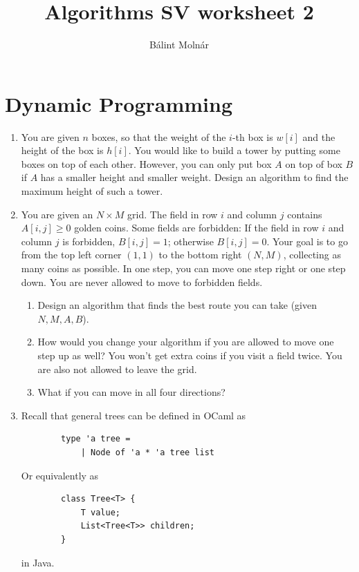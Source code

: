 \documentclass{article}
\title{{Algorithms SV worksheet 2}}
\author{Bálint Molnár}
\begin{document}
\maketitle


\section{Dynamic Programming}

\begin{enumerate}
    \item You are given $n$ boxes, so that the weight of the $i$-th box is $w[i]$ and the height of the box is $h[i]$. You would like to build a tower by putting some boxes on top of each other. However, you can only put box $A$ on top of box $B$ if $A$ has a smaller height and smaller weight. Design an algorithm to find the maximum height of such a tower.
    \item

    You are given an $N \times M$ grid. The field in row $i$ and column $j$ contains $A[i,j]\geq 0$ golden coins. Some fields are forbidden: If the field in row $i$ and column $j$ is forbidden, $B[i,j] = 1$; otherwise $B[i,j]=0$. Your goal is to go from the top left corner $(1,1)$ to the bottom right $(N, M)$, collecting as many coins as possible. In one step, you can move one step right or one step down. You are never allowed to move to forbidden fields.
    \begin{enumerate}
        \item Design an algorithm that finds the best route you can take (given $N, M, A, B$).
        \item How would you change your algorithm if you are allowed to move one step up as well? You won't get extra coins if you visit a field twice. You are also not allowed to leave the grid.
        \item What if you can move in all four directions?
    \end{enumerate}
    
    
    \item Recall that general trees can be defined in OCaml as
    \begin{verbatim}
        type 'a tree =
            | Node of 'a * 'a tree list
    \end{verbatim}

    Or equivalently as

    \begin{verbatim}
        class Tree<T> {
            T value;
            List<Tree<T>> children;
        }
    \end{verbatim}
    in Java.


\end{enumerate}
\end{document}
